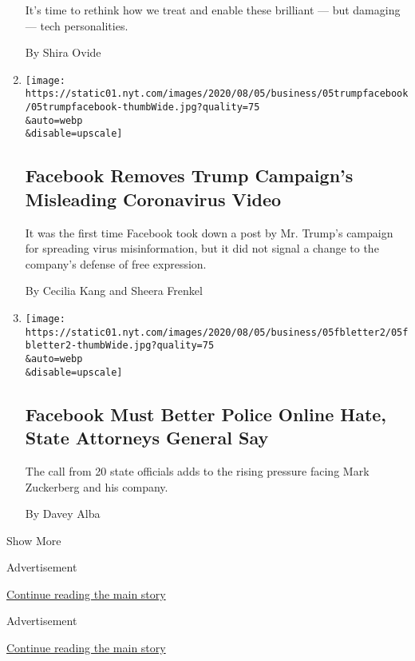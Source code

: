 \begin{enumerate}
  It's time to rethink how we treat and enable these brilliant --- but
  damaging --- tech personalities.

  By Shira Ovide
\item
  \href{/2020/08/05/technology/trump-facebook-coronavirus-video.html}{}

  \texttt{[image: https://static01.nyt.com/images/2020/08/05/business/05trumpfacebook/05trumpfacebook-thumbWide.jpg?quality=75\\\&auto=webp\\\&disable=upscale]}

  \hypertarget{facebook-removes-trump-campaigns-misleading-coronavirus-video}{%
  \subsection{Facebook Removes Trump Campaign's Misleading Coronavirus
  Video}\label{facebook-removes-trump-campaigns-misleading-coronavirus-video}}

  It was the first time Facebook took down a post by Mr. Trump's
  campaign for spreading virus misinformation, but it did not signal a
  change to the company's defense of free expression.

  By Cecilia Kang and Sheera Frenkel
\item
  \href{/2020/08/05/technology/facebook-online-hate.html}{}

  \texttt{[image: https://static01.nyt.com/images/2020/08/05/business/05fbletter2/05fbletter2-thumbWide.jpg?quality=75\\\&auto=webp\\\&disable=upscale]}

  \hypertarget{facebook-must-better-police-online-hate-state-attorneys-general-say}{%
  \subsection{Facebook Must Better Police Online Hate, State Attorneys
  General
  Say}\label{facebook-must-better-police-online-hate-state-attorneys-general-say}}

  The call from 20 state officials adds to the rising pressure facing
  Mark Zuckerberg and his company.

  By Davey Alba
\end{enumerate}

Show More

Advertisement

\protect\hyperlink{after-mid2}{Continue reading the main story}

Advertisement

\protect\hyperlink{after-mktg}{Continue reading the main story}

